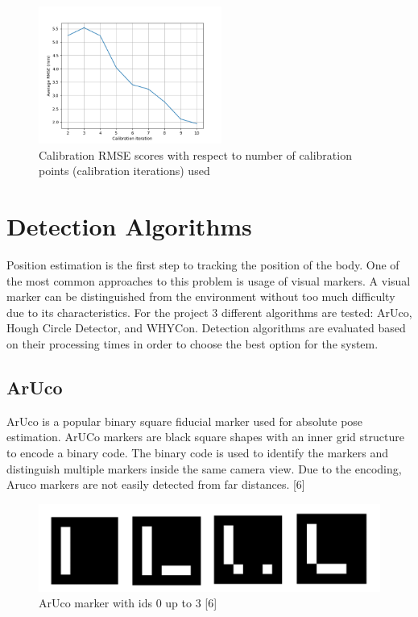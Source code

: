 \begin{figure}[!htb]\centering
    \includegraphics*[width = 6cm]{bilder/project/calibration_result_figures/calibration_accuracy_423mm_rmse-iter.png}
    \caption{Calibration RMSE scores with respect to number of calibration points (calibration iterations) used}
    \label{fig:423mm_rmse}
\end{figure}

\section{Detection Algorithms}

Position estimation is the first step to tracking the position
of the body. One of the most common approaches to this problem
is usage of visual markers. A visual marker can be distinguished
from the environment without too much difficulty due to its
characteristics. For the project 3 different algorithms are tested:
ArUco, Hough Circle Detector, and WHYCon. Detection algorithms
are evaluated based on their processing times in order to choose
the best option for the system.

\subsection{ArUco}

ArUco is a popular binary square fiducial marker used for
absolute pose estimation.  ArUCo markers are black square
shapes with an inner grid structure to encode a binary code.
The binary code is used to identify the markers and distinguish
multiple markers inside the same camera view. Due to the encoding,
Aruco markers are not easily detected from far distances. [6]

\begin{figure}[!htb]\centering
    \includegraphics*[width = 16cm]{bilder/project/aruco_marker.png}
    \caption{ArUco marker with ids 0 up to 3 [6]}
    \label{fig:aruco marker}
\end{figure}


